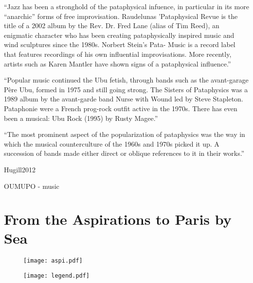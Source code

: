 \spirals




``Jazz has been a stronghold of the pataphysical infuence, in particular in its more “anarchic” forms of free improvisation. Raudelunas ’Pataphysical Revue is the title of a 2002 album by the Rev. Dr. Fred Lane (alias of Tim Reed), an enigmatic character who has been creating pataphysically inspired music and wind sculptures since the 1980s. Norbert Stein’s Pata-
Music is a record label that features recordings of his own influential improvisations. More recently, artists such as Karen Mantler have shown signs of a pataphysical influence.''\autocite*{Hugill2012}

``Popular music continued the Ubu fetish, through bands such as the avant-garage Père Ubu, formed in 1975 and still going strong. The Sisters of Pataphysics was a 1989 album by the avant-garde band Nurse with Wound led by Steve Stapleton. Pataphonie were a French prog-rock outfit active in the 1970s. There has even been a musical: Ubu Rock (1995) by Rusty Magee.''\autocite*{Hugill2012}

``The most prominent aspect of the popularization of pataphysics was the way in which the musical counterculture of the 1960s and 1970s picked it up. A succession of bands made either direct or oblique references to it in their works.''\autocite*{Hugill2012}







\begin{quotation}

\end{quotation}

Hugill2012








OUMUPO - music





\section{From the Aspirations to Paris by Sea}

\begin{figure}[!htb]
\centering
  \texttt{[image: aspi.pdf]}
\end{figure}



\begin{figure}[!htb]
\centering
  \texttt{[image: legend.pdf]}
\end{figure}

\stopcontents[chapters]
